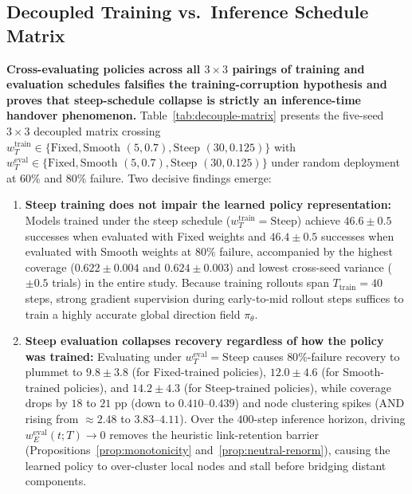 \documentclass[11pt]{article}
\theoremstyle{plain}
\theoremstyle{definition}
\theoremstyle{remark}
\begin{document}
\subsection{Decoupled Training vs.\ Inference Schedule Matrix}
\label{sec:decouple-ablation}
\textbf{Cross-evaluating policies across all $3 \times 3$ pairings of training and evaluation schedules falsifies the training-corruption hypothesis and proves that steep-schedule collapse is strictly an inference-time handover phenomenon.} Table~\ref{tab:decouple-matrix} presents the five-seed $3 \times 3$ decoupled matrix crossing $w_T^{\mathrm{train}} \in \{\text{Fixed}, \text{Smooth } (5, 0.7), \text{Steep } (30, 0.125)\}$ with $w_T^{\mathrm{eval}} \in \{\text{Fixed}, \text{Smooth } (5, 0.7), \text{Steep } (30, 0.125)\}$ under random deployment at $60\%$ and $80\%$ failure. Two decisive findings emerge:
\begin{enumerate}[nosep]
  \item \textbf{Steep training does not impair the learned policy representation:} Models trained under the steep schedule ($w_T^{\mathrm{train}} = \text{Steep}$) achieve $46.6 \pm 0.5$ successes when evaluated with Fixed weights and $46.4 \pm 0.5$ successes when evaluated with Smooth weights at $80\%$ failure, accompanied by the highest coverage ($0.622 \pm 0.004$ and $0.624 \pm 0.003$) and lowest cross-seed variance ($\pm 0.5$ trials) in the entire study. Because training rollouts span $T_{\mathrm{train}} = 40$ steps, strong gradient supervision during early-to-mid rollout steps suffices to train a highly accurate global direction field $\pi_\theta$.
  \item \textbf{Steep evaluation collapses recovery regardless of how the policy was trained:} Evaluating under $w_T^{\mathrm{eval}} = \text{Steep}$ causes $80\%$-failure recovery to plummet to $9.8 \pm 3.8$ (for Fixed-trained policies), $12.0 \pm 4.6$ (for Smooth-trained policies), and $14.2 \pm 4.3$ (for Steep-trained policies), while coverage drops by $18$ to $21\text{ pp}$ (down to $0.410$--$0.439$) and node clustering spikes ($\mathrm{AND}$ rising from $\approx 2.48$ to $3.83$--$4.11$). Over the $400$-step inference horizon, driving $w_E^{\mathrm{eval}}(t; T) \to 0$ removes the heuristic link-retention barrier (Propositions~\ref{prop:monotonicity} and~\ref{prop:neutral-renorm}), causing the learned policy to over-cluster local nodes and stall before bridging distant components.
\end{enumerate}
\end{document}
